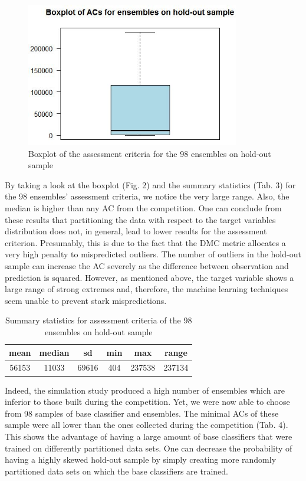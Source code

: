 \documentclass[12pt]{article}
\begin{document}
\begin{figure}[H]
\centering
\includegraphics[width=0.83\textwidth]{boxplotACES.jpg}
\caption{Boxplot of the assessment criteria for the 98 ensembles on hold-out sample}
\end{figure}

By taking a look at the boxplot (Fig. 2) and the summary statistics (Tab. 3) for the 98 ensembles' assessment criteria, we notice the very large range. Also, the median is higher than any AC from the competition. One can conclude from these results that partitioning the data with respect to the target variables distribution does not, in general, lead to lower results for the assessment criterion. Presumably, this is due to the fact that the DMC metric allocates a very high penalty to mispredicted outliers. The number of outliers in the hold-out sample can increase the AC severely as the difference between observation and prediction is squared. However, as mentioned above, the target variable shows a large range of strong extremes and, therefore, the machine learning techniques seem unable to prevent stark mispredictions.

\begin{table}
\centering
\begin{tabular}{|c|c|c|c|c|c|}
\hline
\hline
mean & median & sd & min & max & range\\
\hline
56153 & 11033 & 69616 & 404 & 237538 & 237134\\
\hline
\hline
\end{tabular}
\caption{Summary statistics for assessment criteria of the 98 ensembles on hold-out sample}
\end{table}

Indeed, the simulation study produced a high number of ensembles which are inferior to those built during the competition. Yet, we were now able to choose from 98 samples of base classifier and ensembles. The minimal ACs of these sample were all lower than the ones collected during the competition (Tab. 4). This shows the advantage of having a large amount of base classifiers that were trained on differently partitioned data sets. One can decrease the probability of having a highly skewed hold-out sample by simply creating more randomly partitioned data sets on which the base classifiers are trained.
\end{document}
